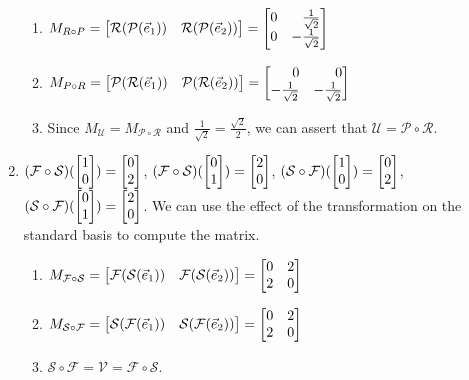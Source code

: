 \begin{exercises}
\begin{problist}
\begin{solution}
\begin{enumerate}
					\begin{enumerate}
						\item $M_{R\circ P}= \mat{\mathcal R(\mathcal
							P(\xhat))& \mathcal R( \mathcal P(\yhat))}=
							\mat{0&\tfrac{1}{\sqrt{2}}\\0&-\tfrac{1}{\sqrt{2}}}$

						\item $M_{P\circ R}= \mat{\mathcal P(
							\mathcal R(\xhat))& \mathcal P(\mathcal
							R(\yhat))}= \mat{0&0\\-\tfrac{1}{\sqrt{2}}&-\tfrac{1}{\sqrt{2}}}$

						\item Since $M_{\mathcal U}=M_{\mathcal P
							\circ \mathcal R}$ and $\tfrac{1}{\sqrt{2}}=\tfrac{\sqrt{2}}{2}$,
							we can assert that
							$\mathcal U=\mathcal P \circ
							\mathcal R$.
					\end{enumerate}

				\item $(\mathcal F \circ \mathcal S)(\mat{1\\0}) = \mat{0\\2}$,
					$(\mathcal F \circ \mathcal S)(\mat{0\\1}) = \mat{2\\0}$,
					$(\mathcal S \circ \mathcal F)(\mat{1\\0}) = \mat{0\\2}$,
					$(\mathcal S \circ \mathcal F)(\mat{0\\1}) = \mat{2\\0}$.
					We can use the effect of the transformation on the
					standard basis to compute the matrix.
					\begin{enumerate}
						\item $M_{\mathcal F \circ \mathcal S}=\mat{\mathcal
							F( \mathcal S(\xhat))& \mathcal F(\mathcal
							S(\yhat))}=\mat{0&2\\2&0}$

						\item $M_{\mathcal S \circ \mathcal F}=\mat{\mathcal
							S( \mathcal F(\xhat))& \mathcal S(\mathcal
							F(\yhat))}=\mat{0&2\\2&0}$

						\item $\mathcal S\circ \mathcal F=
							\mathcal V = \mathcal F \circ
							\mathcal S$.
					\end{enumerate}
			\end{enumerate}
		\end{solution}


\end{problist}
\end{exercises}
